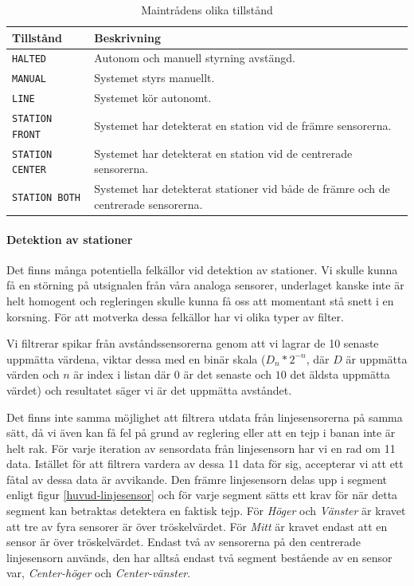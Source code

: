 \begin{table}[h!]
	\centering
	\begin{tabularx}{\textwidth}{| l | X |}
		\hline
		{\textbf{Tillstånd}} & {\textbf{Beskrivning}} \\\hline
		{\texttt{HALTED}} & {Autonom och manuell styrning avstängd.} \\\hline
		{\texttt{MANUAL}} & {Systemet styrs manuellt.} \\\hline
		{\texttt{LINE}} & {Systemet kör autonomt.} \\\hline
		{\texttt{STATION FRONT}} & {Systemet har detekterat en station vid de främre sensorerna.} \\\hline
		{\texttt{STATION CENTER}} & {Systemet har detekterat en station vid de centrerade sensorerna.} \\\hline
		{\texttt{STATION BOTH}} & {Systemet har detekterat stationer vid både de främre och de centrerade sensorerna.} \\\hline
	\end{tabularx}
	\caption{Maintrådens olika tillstånd} \label{huvud-tillstand}
\end{table}

\paragraph{Detektion av stationer}

Det finns många potentiella felkällor vid detektion av stationer. Vi skulle kunna få en störning på utsignalen från våra analoga sensorer, underlaget kanske inte är helt homogent och regleringen skulle kunna få oss att momentant stå snett i en korsning. För att motverka dessa felkällor har vi olika typer av filter.

Vi filtrerar spikar från avståndssensorerna genom att vi lagrar de 10 senaste uppmätta värdena, viktar dessa med en binär skala ($D_{n}*2^{-n}$, där $D$ är uppmätta värden och $n$ är index i listan där $0$ är det senaste och $10$ det äldsta uppmätta värdet) och resultatet säger vi är det uppmätta avståndet.

Det finns inte samma möjlighet att filtrera utdata från linjesensorerna på samma sätt, då vi även kan få fel på grund av reglering eller att en tejp i banan inte är helt rak. För varje iteration av sensordata från linjesensorn har vi en rad om 11 data. Istället för att filtrera vardera av dessa 11 data för sig, accepterar vi att ett fåtal av dessa data är avvikande. Den främre linjesensorn delas upp i segment enligt figur \ref{huvud-linjesensor} och för varje segment sätts ett krav för när detta segment kan betraktas detektera en faktisk tejp. För \textit{Höger} och \textit{Vänster} är kravet att tre av fyra sensorer är över tröskelvärdet. För \textit{Mitt} är kravet endast att en sensor är över tröskelvärdet. Endast två av sensorerna på den centrerade linjesensorn används, den har alltså endast två segment bestående av en sensor var, \textit{Center-höger} och \textit{Center-vänster}.

